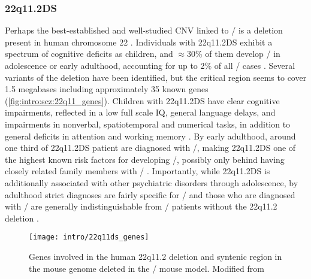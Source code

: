 \subsubsection{\acl{22q11.2DS}}
\label{sec:intro:scz:22q11}
Perhaps the best-established and well-studied \ac{CNV} linked to \scz/ is a deletion present in human chromosome 22 \citep[22q11.2;][]{Karayiorgou1995, Chow2006, Karayiorgou2010}.
Individuals with \ac{22q11.2DS} exhibit a spectrum of cognitive deficits as children, and $\approx$30\% of them develop \scz/ in adolescence or early adulthood, accounting for up to 2\% of all \scz/ cases \citep{Stark2008}.
Several variants of the deletion have been identified, but the critical region seems to cover 1.5 megabases including approximately 35 known genes (\autoref{fig:intro:scz:22q11_genes}).
Children with \ac{22q11.2DS} have clear cognitive impairments, reflected in a low full scale IQ, general language delays, and impairments in nonverbal, spatiotemporal and numerical tasks, in addition to general deficits in attention and working memory \citep{Karayiorgou2010}.
By early adulthood, around one third of \ac{22q11.2DS} patient are diagnosed with \scz/, making \ac{22q11.2DS} one of the highest known risk factors for developing \scz/, possibly only behind having closely related family members with \scz/ \citep{Murphy1999}.
Importantly, while \ac{22q11.2DS} is additionally associated with other psychiatric disorders through adolescence, by adulthood strict diagnoses are fairly specific for \scz/ and those who are diagnosed with \scz/ are generally indistinguishable from \scz/ patients without the 22q11.2 deletion \citep{Karayiorgou2010}.

\begin{figure}
	\centering
	\texttt{[image: intro/22q11ds\_genes]}
	\caption[Genetic deletion in 22q11.2DS and \df/]{Genes involved in the human 22q11.2 deletion and syntenic region in the mouse genome deleted in the \df/ mouse model. Modified from \citet{Karayiorgou2010}}
	\label{fig:intro:scz:22q11_genes}
\end{figure}

